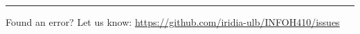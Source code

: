 \documentclass[11pt,a4paper]{article}
\theoremstyle{definition}%
\newtheorem{Q}{Question}[] %
\begin{document}


\noindent
\rule{\textwidth}{0.4pt}
\footnotesize{Found an error? Let us know: \url{https://github.com/iridia-ulb/INFOH410/issues}}
\end{document}

